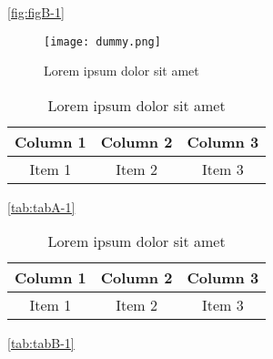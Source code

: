 \lipsum[1-1] \ref{fig:figB-1}

\begin{figure}[H]
    \centering
    \texttt{[image: dummy.png]}
    \caption{Lorem ipsum dolor sit amet}
    \label{fig:figB-3}
\end{figure}


\lipsum[1-1] \cite{reference-1}


\lipsum[1-1] \cite{reference-2}


\lipsum[1-1] \cite{reference-3}


\begin{table}[ht!]
    \centering
    \begin{tabular}{c c c}
        \hline
        Column 1 & Column 2 & Column 3 \\
        \hline
        Item 1   & Item 2   & Item 3   \\
    \end{tabular}
    \caption{Lorem ipsum dolor sit amet}
    \label{tab:tabA-3}
\end{table}

\lipsum[1-1] \ref{tab:tabA-1}

\begin{table}[ht!]
    \centering
    \begin{tabular}{c c c}
        \hline
        Column 1 & Column 2 & Column 3 \\
        \hline
        Item 1   & Item 2   & Item 3   \\
    \end{tabular}
    \caption{Lorem ipsum dolor sit amet}
    \label{tab:tabB-3}
\end{table}

\lipsum[1-1] \ref{tab:tabB-1}

\lipsum[1-2]